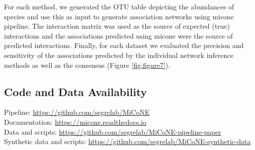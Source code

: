   For each method, we generated the OTU table depicting the abundances of species and use this as input to generate association networks using \ac{micone} pipeline.
  The interaction matrix was used as the source of expected (true) interactions and the associations predicted using \ac{micone} were the source of predicted interactions.
  Finally, for each dataset we evaluated the precision and sensitivity of the associations predicted by the individual network inference methods as well as the consensus (Figure \ref{fig:figure7}).

  \subsection*{Code and Data Availability}
  Pipeline: \href{https://github.com/segrelab/MiCoNE}{https://github.com/segrelab/MiCoNE} \\
  Documentation: \href{https://micone.readthedocs.io}{https://micone.readthedocs.io} \\
  Data and scripts: \href{https://github.com/segrelab/MiCoNE-pipeline-paper}{https://github.com/segrelab/MiCoNE-pipeline-paper} \\
  Synthetic data and scripts: \href{https://github.com/segrelab/MiCoNE-synthetic-data}{https://github.com/segrelab/MiCoNE-synthetic-data}
